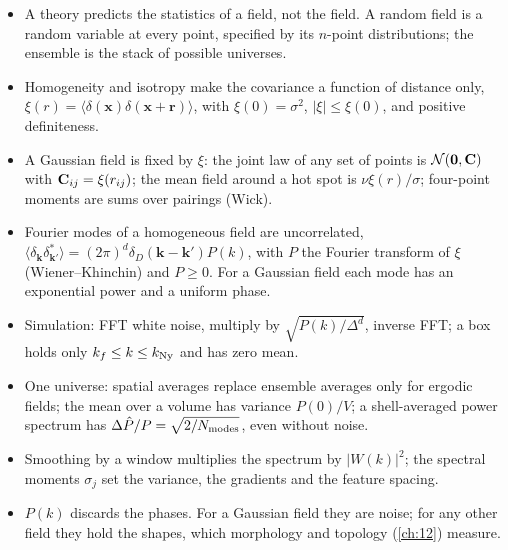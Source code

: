 \begin{recap}
\begin{itemize}
  \item A theory predicts the statistics of a field, not the field. A random field is a
        random variable at every point, specified by its $n$-point distributions; the
        ensemble is the stack of possible universes.
  \item Homogeneity and isotropy make the covariance a function of distance only,
        $\xi(r)=\langle\delta(\bm x)\delta(\bm x+\bm r)\rangle$, with $\xi(0)=\sigma^2$,
        $|\xi|\le\xi(0)$, and positive definiteness.
  \item A Gaussian field is fixed by $\xi$: the joint law of any set of points is
        $\mathcal{N}(\bm0,\mathbf{C})$ with $\mathbf{C}_{ij}=\xi(r_{ij})$; the mean field around a
        hot spot is $\nu\xi(r)/\sigma$; four-point moments are sums over pairings (Wick).
  \item Fourier modes of a homogeneous field are uncorrelated,
        $\langle\delta_{\bm k}\delta_{\bm k'}^*\rangle=(2\pi)^d\delta_D(\bm k-\bm k')P(k)$,
        with $P$ the Fourier transform of $\xi$ (Wiener--Khinchin) and $P\ge0$. For a
        Gaussian field each mode has an exponential power and a uniform phase.
  \item Simulation: FFT white noise, multiply by $\sqrt{P(k)/\Delta^d}$, inverse FFT;
        a box holds only $k_f\le k\le k_{\rm Ny}$ and has zero mean.
  \item One universe: spatial averages replace ensemble averages only for ergodic
        fields; the mean over a volume has variance $P(0)/V$; a shell-averaged
        power spectrum has $\Delta\hat P/P=\sqrt{2/N_{\rm modes}}$, even without noise.
  \item Smoothing by a window multiplies the spectrum by $|W(k)|^2$; the spectral
        moments $\sigma_j$ set the variance, the gradients and the feature spacing.
  \item $P(k)$ discards the phases. For a Gaussian field they are noise; for any other
        field they hold the shapes, which morphology and topology (\cref{ch:12}) measure.
\end{itemize}
\end{recap}
\providecommand{\SBdipA}{}\renewcommand{\SBdipA}{3}
\providecommand{\SBdipTh}{}\renewcommand{\SBdipTh}{6.139960}
\providecommand{\SBdipNum}{}\renewcommand{\SBdipNum}{6.139960}
\providecommand{\SBdipOther}{}\renewcommand{\SBdipOther}{1.009\times10^{-15}}
\providecommand{\SBnRealSix}{}\renewcommand{\SBnRealSix}{361197}
